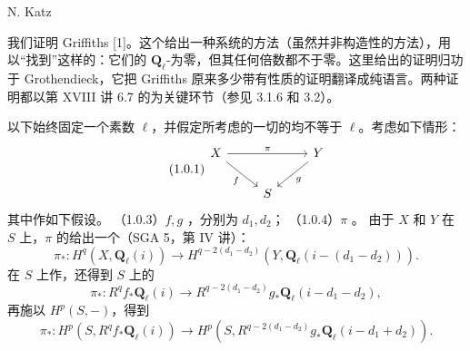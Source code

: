 \begin{center}N. Katz\end{center}
我们证明 Griffiths  [1]。这个给出一种系统的方法（虽然并非构造性的方法），用以“找到”这样的：它们的 $\mathbf Q_\ell$-为零，但其任何倍数都不于零。这里给出的证明归功于 Grothendieck，它把 Griffiths 原来多少带有性质的证明翻译成纯语言。两种证明都以第 XVIII 讲 6.7 的为关键环节（参见 3.1.6 和 3.2）。

以下始终固定一个素数 $\ell$，并假定所考虑的一切的均不等于 $\ell$。考虑如下情形：
\begin{equation}\tag{1.0.1}
\begin{tikzcd}
X \arrow[rr,"\pi"] \arrow[dr,"f"'] && Y \arrow[dl,"g"]\\
& S &
\end{tikzcd}
\end{equation}
其中作如下假设。
\noindent（1.0.3）$f,g$ ，分别为 $d_1,d_2$；
\noindent（1.0.4）$\pi$ 。
由于 $X$ 和 $Y$ 在 $S$ 上，$\pi$ 的给出一个（SGA 5，第 IV 讲）：
\begin{equation}\tag{1.0.5}
\pi_*:H^q(X,\mathbf Q_\ell(i))\longrightarrow H^{q-2(d_1-d_2)}(Y,\mathbf Q_\ell(i-(d_1-d_2))).
\end{equation}
在 $S$ 上作，还得到 $S$ 上的
\begin{equation}\tag{1.0.6}
\pi_*:R^qf_*\mathbf Q_\ell(i)\longrightarrow R^{q-2(d_1-d_2)}g_*\mathbf Q_\ell(i-d_1-d_2),
\end{equation}
再施以 $H^p(S,-)$，得到
\begin{equation}\tag{1.0.7}
\pi_*:H^p(S,R^qf_*\mathbf Q_\ell(i))\longrightarrow H^p(S,R^{q-2(d_1-d_2)}g_*\mathbf Q_\ell(i-d_1+d_2)).
\end{equation}
